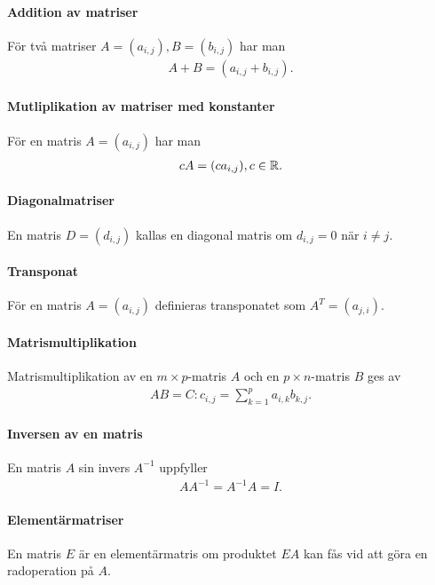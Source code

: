 \paragraph{Addition av matriser}
För två matriser $A = (a_{i,j}), B = (b_{i,j})$ har man
\begin{align*}
	A + B = (a_{i,j} + b_{i,j}).
\end{align*} 

\paragraph{Mutliplikation av matriser med konstanter}
För en matris $A = (a_{i,j})$ har man
\begin{align*}
	cA = (ca_{i,j}), c\in\mathbb{R}.
\end{align*}

\paragraph{Diagonalmatriser}
En matris $D = (d_{i,j})$ kallas en diagonal matris om $d_{i,j} = 0$ när $i\neq j$.

\paragraph{Transponat}
För en matris $A = (a_{i,j})$ definieras transponatet som $A^T = (a_{j,i})$.

\paragraph{Matrismultiplikation}
Matrismultiplikation av en $m\times p$-matris $A$ och en $p\times n$-matris $B$ ges av
\begin{align*}
	AB = C: c_{i,j} = \sum\limits_{k = 1}^{p} a_{i, k}b_{k,j}.
\end{align*}

\paragraph{Inversen av en matris}
En matris $A$ sin invers $A^{-1}$ uppfyller
\begin{align*}
	AA^{-1} = A^{-1}A = I.
\end{align*}

\paragraph{Elementärmatriser}
En matris $E$ är en elementärmatris om produktet $EA$ kan fås vid att göra en radoperation på $A$.

